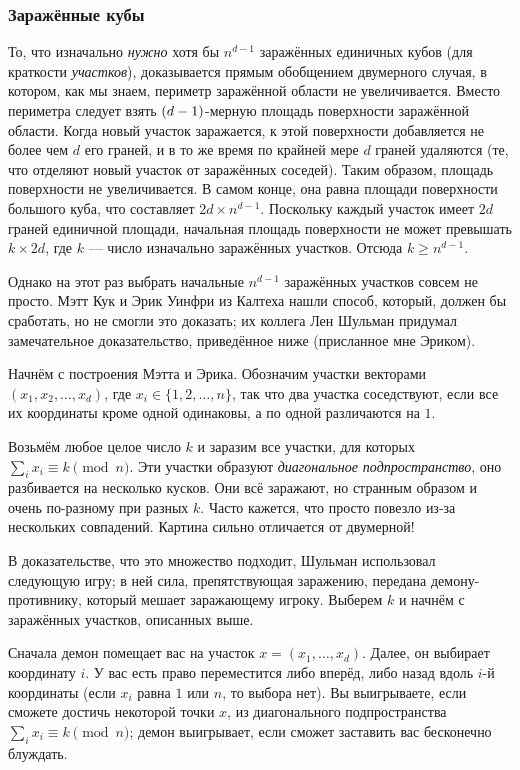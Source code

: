 \subsubsection*{Заражённые кубы}

То, что изначально \emph{нужно} хотя бы $n^{d-1}$ заражённых единичных кубов (для краткости \emph{участков}), доказывается прямым обобщением двумерного случая, в котором, как мы знаем, периметр заражённой области не увеличивается.
Вместо периметра следует взять $(d\z-1)$-мерную площадь поверхности заражённой области.
Когда новый участок заражается, к этой поверхности добавляется не более чем $d$ его граней,
и в то же время по крайней мере $d$ граней удаляются (те, что отделяют новый участок от заражённых соседей).
Таким образом, площадь поверхности не увеличивается.
В самом конце, она равна площади поверхности большого куба, что составляет $2d \times n^{d-1}$.
Поскольку каждый участок имеет $2d$ граней единичной площади,
начальная площадь поверхности не может превышать $k \times 2d$,
где $k$ --- число изначально заражённых участков.
Отсюда $k\geqslant n^{d-1}$.

Однако на этот раз выбрать начальные $n^{d-1}$ заражённых участков совсем не просто.
Мэтт Кук и Эрик Уинфри из Калтеха нашли способ, который, должен бы сработать, но не смогли это доказать;
их коллега Лен Шульман придумал замечательное доказательство, приведённое ниже (присланное мне Эриком).

Начнём с построения Мэтта и Эрика.
Обозначим участки векторами $(x_1 , x_2 , \dots , x_d )$, где $x_i \in \{1, 2, \dots , n\}$, так что два участка соседствуют, 
если все их координаты кроме одной одинаковы, а по одной различаются на $1$.

Возьмём любое целое число $k$ и заразим все участки, для которых $\sum_i x_i \equiv k\pmod n$.
Эти участки образуют \emph{диагональное подпространство}, оно разбивается на несколько кусков.
Они всё заражают, но странным образом и очень по-разному при разных $k$.
Часто кажется, что просто повезло из-за нескольких совпадений.
Картина сильно отличается от двумерной!

В доказательстве, что это множество подходит, Шульман использовал следующую игру;
в ней сила, препятствующая заражению, передана демону-противнику, который мешает заражающему игроку.
Выберем $k$ и начнём с заражённых участков, описанных выше.

Сначала демон помещает вас на участок $x = (x_1, \dots,x_d )$.
Далее, он выбирает координату $i$.
У вас есть право переместится либо вперёд, либо назад вдоль $i$-й координаты (если $x_i$ равна $1$ или $n$, то выбора нет).
Вы выигрываете, если сможете достичь некоторой точки $x$, из диагонального подпространства $\sum_i x_i \equiv k\pmod n$;
демон выигрывает, если сможет заставить вас бесконечно блуждать.

